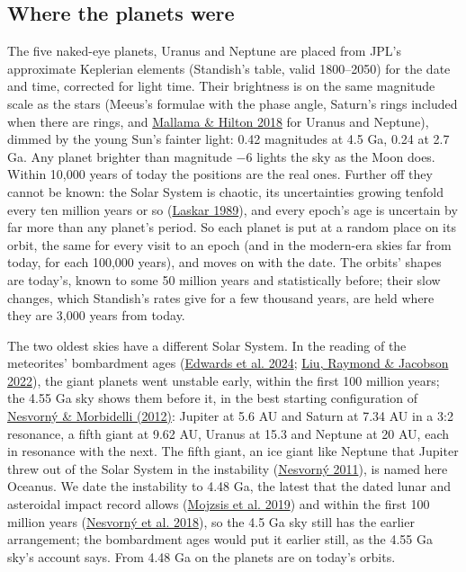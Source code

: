 \documentclass[9pt,twocolumn]{extarticle}
\begin{document}
\subsection{Where the planets were}\label{where-the-planets-were}

The five naked-eye planets, Uranus and Neptune are placed from JPL's approximate Keplerian elements (Standish's table, valid 1800--2050) for the date and time, corrected for light time. Their brightness is on the same magnitude scale as the stars (Meeus's formulae with the phase angle, Saturn's rings included when there are rings, and \protect\hyperlink{cite.mallama2018}{Mallama \& Hilton 2018} for Uranus and Neptune), dimmed by the young Sun's fainter light: 0.42 magnitudes at 4.5 Ga, 0.24 at 2.7 Ga. Any planet brighter than magnitude $-$6 lights the sky as the Moon does. Within 10,000 years of today the positions are the real ones. Further off they cannot be known: the Solar System is chaotic, its uncertainties growing tenfold every ten million years or so (\protect\hyperlink{cite.laskar1989}{Laskar 1989}), and every epoch's age is uncertain by far more than any planet's period. So each planet is put at a random place on its orbit, the same for every visit to an epoch (and in the modern-era skies far from today, for each 100,000 years), and moves on with the date. The orbits' shapes are today's, known to some 50 million years and statistically before; their slow changes, which Standish's rates give for a few thousand years, are held where they are 3,000 years from today.

The two oldest skies have a different Solar System. In the reading of the meteorites' bombardment ages (\protect\hyperlink{cite.edwards2024}{Edwards et al. 2024}; \protect\hyperlink{cite.liu2022}{Liu, Raymond \& Jacobson 2022}), the giant planets went unstable early, within the first 100 million years; the 4.55 Ga sky shows them before it, in the best starting configuration of \protect\hyperlink{cite.nesvorny2012}{Nesvorný \& Morbidelli (2012)}: Jupiter at 5.6 AU and Saturn at 7.34 AU in a 3:2 resonance, a fifth giant at 9.62 AU, Uranus at 15.3 and Neptune at 20 AU, each in resonance with the next. The fifth giant, an ice giant like Neptune that Jupiter threw out of the Solar System in the instability (\protect\hyperlink{cite.nesvorny2011}{Nesvorný 2011}), is named here Oceanus. We date the instability to 4.48 Ga, the latest that the dated lunar and asteroidal impact record allows (\protect\hyperlink{cite.mojzsis2019}{Mojzsis et al. 2019}) and within the first 100 million years (\protect\hyperlink{cite.nesvorny2018}{Nesvorný et al. 2018}), so the 4.5 Ga sky still has the earlier arrangement; the bombardment ages would put it earlier still, as the 4.55 Ga sky's account says. From 4.48 Ga on the planets are on today's orbits.
\end{document}
